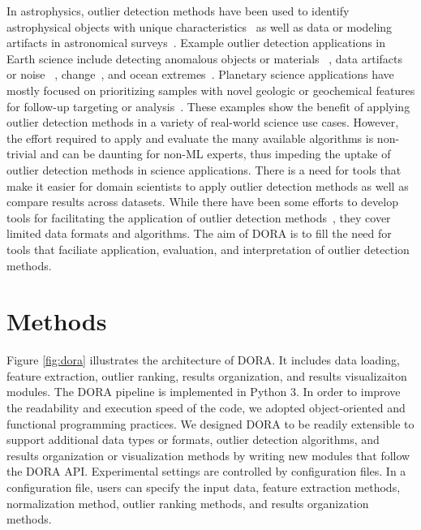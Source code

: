 \documentclass[letterpaper]{article} %
\begin{document}
In astrophysics, 
outlier detection methods have been used to identify astrophysical
objects with unique characteristics~\cite{xiong2010anomaly,
storey2020anomaly,hayat2021self} as well as data or modeling 
artifacts in astronomical surveys~\citep{wagstaff:des-anom20,
lochner2021astronomaly}. 
Example outlier detection applications in 
Earth science include detecting anomalous objects or materials
~\cite{chang2002anomaly,zhou2016novel}, data artifacts or noise 
~\cite{liu2017unsupervised,alvera2012outlier}, change~\cite{zhou2016novel,
touati2020anomaly}, and ocean extremes~\cite{prochaska2021deep}. 
Planetary science applications have mostly focused 
on prioritizing samples with novel geologic or geochemical features for
follow-up targeting or analysis~\cite{kerner2020analysis,kerner2020comparison,
wagstaff:demud13}.
%
These examples show the benefit of applying outlier detection methods in
a variety of real-world science use cases. However, the effort required to 
apply and evaluate the many available algorithms is non-trivial and can 
be daunting for non-ML experts, thus impeding the uptake of outlier
detection methods in science applications.  
There is a need for tools that make it easier for domain scientists to apply
outlier detection methods as well as compare results across datasets.
While there have been some efforts to develop tools for facilitating the
application of outlier detection methods~\cite{zhao2019pyod}, they cover
limited data formats and algorithms. The aim of DORA is to fill the need 
for tools that faciliate application, evaluation, and interpretation of outlier
detection methods.

\section{Methods}

Figure \ref{fig:dora} illustrates the architecture of DORA. It includes 
data loading, feature extraction, outlier ranking, results organization, and 
results visualizaiton modules. The DORA pipeline is implemented in Python 3.
In order to improve the readability and execution speed of the code, we adopted
object-oriented and functional programming practices.  We designed DORA to be 
readily extensible to support additional data types or formats, outlier detection 
algorithms, and results organization or visualization methods by writing new 
modules that follow the DORA API. Experimental settings are controlled by 
configuration files. In a configuration file, users can specify the input data, 
feature extraction methods, normalization method, outlier ranking methods, and 
results organization methods. 
\end{document}
